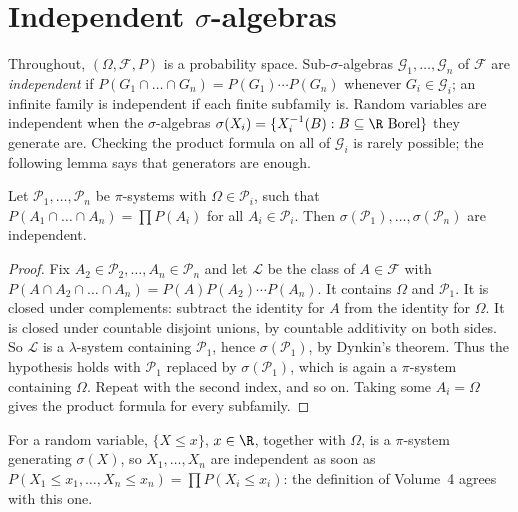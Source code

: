 \section{Independent $\sigma$-algebras}

Throughout, $(\Omega,\mathcal F,P)$ is a probability space. Sub-$\sigma$-algebras $\mathcal G_1,\dots,\mathcal G_n$ of
$\mathcal F$ are \emph{independent} if $P(G_1\cap\dots\cap G_n)=P(G_1)\cdots P(G_n)$ whenever $G_i\in\mathcal G_i$; an
infinite family is independent if each finite subfamily is. Random variables are independent when the $\sigma$-algebras
$\sigma(X_i)=\{X_i^{-1}(B):B\subseteq\R\text{ Borel}\}$ they generate are. Checking the product formula on all of $\mathcal G_i$ is rarely possible;
the following lemma says that generators are enough.

\begin{lemma}\label{lem:pisuffice}
Let $\mathcal P_1,\dots,\mathcal P_n$ be $\pi$-systems with $\Omega\in\mathcal P_i$, such that $P(A_1\cap\dots\cap A_n)=
\prod P(A_i)$ for all $A_i\in\mathcal P_i$. Then $\sigma(\mathcal P_1),\dots,\sigma(\mathcal P_n)$ are independent.
\end{lemma}
\begin{proof}
Fix $A_2\in\mathcal P_2,\dots,A_n\in\mathcal P_n$ and let $\mathcal L$ be the class of $A\in\mathcal F$ with
$P(A\cap A_2\cap\dots\cap A_n)=P(A)P(A_2)\cdots P(A_n)$. It contains $\Omega$ and $\mathcal P_1$. It is closed under
complements: subtract the identity for $A$ from the identity for $\Omega$. It is closed under countable disjoint unions, by
countable additivity on both sides. So $\mathcal L$ is a $\lambda$-system containing $\mathcal P_1$, hence $\sigma(
\mathcal P_1)$, by Dynkin's theorem. Thus the hypothesis holds with $\mathcal P_1$ replaced by $\sigma(\mathcal P_1)$, which is
again a $\pi$-system containing $\Omega$. Repeat with the second index, and so on. Taking some $A_i=\Omega$ gives the
product formula for every subfamily.
\end{proof}

For a random variable, $\{X\le x\}$, $x\in\R$, together with $\Omega$, is a $\pi$-system generating $\sigma(X)$, so
$X_1,\dots,X_n$ are independent as soon as $P(X_1\le x_1,\dots,X_n\le x_n)=\prod P(X_i\le x_i)$: the definition of Volume~4
agrees with this one.

